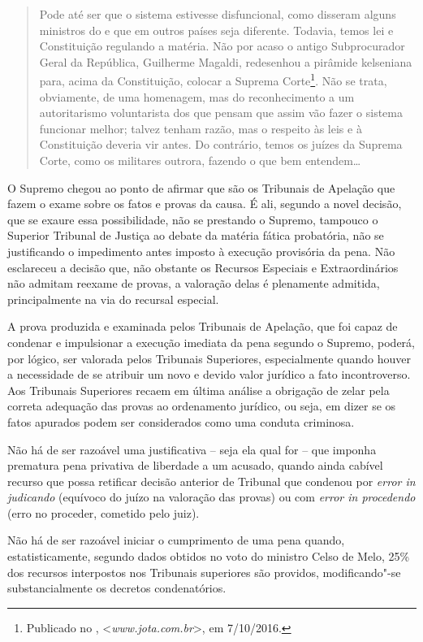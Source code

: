 \begin{quote}
Pode até ser que o sistema
estivesse disfuncional, como disseram alguns ministros do  e que em
outros países seja diferente. Todavia, temos lei e Constituição
regulando a matéria. Não por acaso o antigo Subprocurador Geral da
República, Guilherme Magaldi, redesenhou a pirâmide kelseniana
para, acima da Constituição, colocar a Suprema Corte\footnote{Publicado
  no , \textless{}\emph{www.jota.com.br}\textgreater{}, em 7/10/2016.}. Não se trata,
obviamente, de uma homenagem, mas do reconhecimento a um autoritarismo
voluntarista dos que pensam que assim vão fazer o sistema funcionar
melhor; talvez tenham razão, mas o respeito às leis e à Constituição
deveria vir antes. Do contrário, temos os juízes da Suprema Corte, como
os militares outrora, fazendo o que bem entendem\ldots{}
\end{quote}

O Supremo chegou ao ponto de afirmar que são os Tribunais de Apelação
que fazem o exame sobre os fatos e provas da causa. É ali, segundo a
novel decisão, que se exaure essa possibilidade, não se prestando o
Supremo, tampouco o Superior Tribunal de Justiça ao debate da matéria
fática probatória, não se justificando o impedimento antes imposto à
execução provisória da pena. Não esclareceu a decisão que, não obstante
os Recursos Especiais e Extraordinários não admitam reexame de provas, a
valoração delas é plenamente admitida, principalmente na via do recursal
especial.

A prova produzida e examinada pelos Tribunais de Apelação, que foi capaz
de condenar e impulsionar a execução imediata da pena segundo o Supremo,
poderá, por lógico, ser valorada pelos Tribunais Superiores,
especialmente quando houver a necessidade de se atribuir um novo e
devido valor jurídico a fato incontroverso. Aos Tribunais Superiores
recaem em última análise a obrigação de zelar pela correta adequação das
provas ao ordenamento jurídico, ou seja, em dizer se os fatos apurados
podem ser considerados como uma conduta criminosa.

Não há de ser razoável uma justificativa -- seja ela qual for -- que
imponha prematura pena privativa de liberdade a um acusado, quando ainda
cabível recurso que possa retificar decisão anterior de Tribunal que
condenou por \emph{error in judicando} (equívoco do juízo na valoração das
provas) ou com \emph{error in procedendo} (erro no proceder, cometido pelo
juiz).

Não há de ser razoável iniciar o cumprimento de uma pena quando,
estatisticamente, segundo dados obtidos no voto do ministro Celso de
Melo, 25\% dos recursos interpostos nos Tribunais superiores são
providos, modificando"-se substancialmente os decretos condenatórios.

